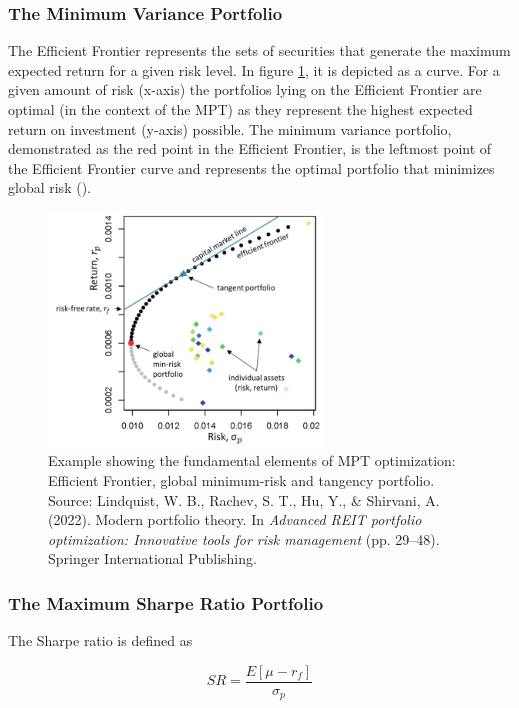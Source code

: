 \documentclass[a4paper,12pt]{article}
\begin{document}
\subsubsection{The Minimum Variance Portfolio}
The Efficient Frontier represents the sets of securities that generate the maximum expected return for a given risk level. In figure \ref{fig:1}, it is depicted as a curve. For a given amount of risk (x-axis) the portfolios lying on the Efficient Frontier are optimal (in the context of the MPT) as they represent the highest expected return on investment (y-axis) possible. The minimum variance portfolio, demonstrated as the red point in the Efficient Frontier, is the leftmost point of the Efficient Frontier curve and represents the optimal portfolio that minimizes global risk (\cite{mangram2013simplified}). 

\begin{figure}[H]
    \centering
    \includegraphics[width=0.65\textwidth]{resources/Bildschirm.png}
    \caption{Example showing the fundamental elements of MPT optimization: Efficient Frontier, global minimum-risk and tangency portfolio. Source: Lindquist, W. B., Rachev, S. T., Hu, Y., \& Shirvani, A. (2022). Modern portfolio theory. In \textit{Advanced REIT portfolio optimization: Innovative tools for risk management} (pp. 29–48). Springer International Publishing.}
    \label{fig:1}
\end{figure}


\subsubsection{The Maximum Sharpe Ratio Portfolio}
The Sharpe ratio is defined as 

\begin{equation} \label{eq: sr}
    SR = \frac{E[\mu - r_f]}{\sigma_p}
\end{equation}
\end{document}
